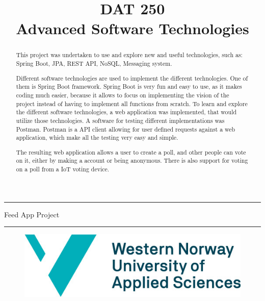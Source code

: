 \documentclass[11pt]{article}
\begin{document}

\title{DAT 250\\Advanced Software Technologies}


\maketitle
\noindent\rule{\textwidth}{1.6pt}\vspace*{\baselineskip}\vspace{2pt}
\vspace{0.75\baselineskip}
{\huge \centering
Feed App Project\\}
\vspace{0.75\baselineskip}
\noindent\rule{\textwidth}{1.6pt}\vspace*{-\baselineskip}\vspace{2pt}
\vspace{9pc}
\begin{figure}[H]
  \centering
  \includegraphics[scale=0.5]{figs/HVL_logo.jpg}
  \label{fig:logo}
\end{figure}
\newpage

\tableofcontents
\newpage
{}
\begin{abstract}

  This project was undertaken to use and explore new and useful technologies, such as: Spring Boot, JPA, REST API, NoSQL, Messaging system.
  
  Different software technologies are used to implement the different technologies. One of them is Spring Boot framework. Spring Boot is very fun and easy to use, as it makes coding much easier, because it allows to focus on implementing the vision of the project instead of having to implement all functions from scratch. To learn and explore the different software technologies, a web application was implemented, that would utilize those technologies. A software for testing different implementations was Postman. Postman is a API client allowing for user defined requests against a web application, which make all the testing very easy and simple.
  
  The resulting web application allows a user to create a poll, and other people can vote on it, either by making a account or being anonymous. There is also support for voting on a poll from a IoT voting device.

\end{abstract}
\newpage
\end{document}
